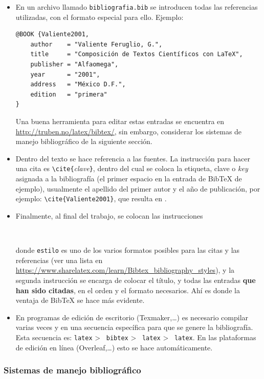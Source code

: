 \documentclass[12pt,letterpaper]{article}
\begin{document}
\begin{itemize}
\item En un archivo llamado \texttt{bibliografia.bib} se introducen todas las referencias utilizadas, con el formato especial para ello. Ejemplo:
\begin{verbatim}
@BOOK {Valiente2001,
    author    = "Valiente Feruglio, G.",
    title     = "Composición de Textos Científicos con LaTeX",
    publisher = "Alfaomega",
    year      = "2001",
    address   = "México D.F.",
    edition   = "primera"
}
\end{verbatim}
Una buena herramienta para editar estas entradas se encuentra en \url{http://truben.no/latex/bibtex/}, sin embargo, considerar los sistemas de manejo bibliográfico de la siguiente sección.

\item Dentro del texto se hace referencia a las fuentes. La instrucción para hacer una cita es \verb+\cite{+\textit{clave}\verb+}+, dentro del cual se coloca la etiqueta, clave o \textit{key} asignada a la bibliografía (el primer espacio en la entrada de BibTeX de ejemplo), usualmente el apellido del primer autor y el año de publicación, por ejemplo: \verb+\cite{Valiente2001}+, que resulta en \cite{Valiente2001}.

\item Finalmente, al final del trabajo, se colocan las instrucciones 
\begin{verbatim}


\end{verbatim}
donde \texttt{estilo} es uno de los varios formatos posibles para las citas y las referencias (ver una lista en \url{https://www.sharelatex.com/learn/Bibtex_bibliography_styles}), y la segunda instrucción se encarga de colocar el título, y todas las entradas \textbf{que han sido citadas}, en el orden y el formato necesarios. Ahí es donde la ventaja de BibTeX se hace más evidente. 

\item En programas de edición de escritorio (Texmaker,\ldots) es necesario compilar varias veces y en una secuencia específica para que se genere la bibliografía. Esta secuencia es: \texttt{latex} \textgreater~ \texttt{bibtex} \textgreater~ \texttt{latex} \textgreater~ \texttt{latex}. En las plataformas de edición en línea (Overleaf,\ldots) esto se hace automáticamente.
\end{itemize}

\subsubsection{Sistemas de manejo bibliográfico}
\end{document}
